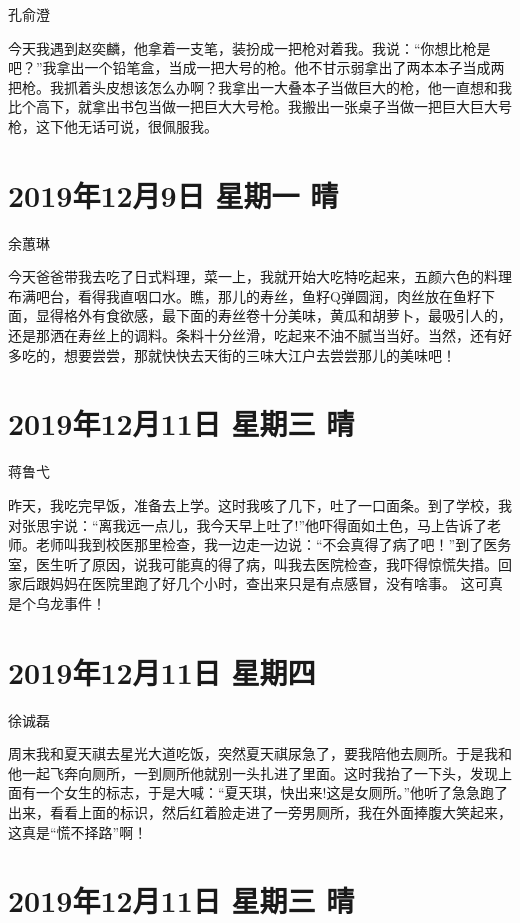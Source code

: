孔俞澄

今天我遇到赵奕麟，他拿着一支笔，装扮成一把枪对着我。我说：``你想比枪是吧？''我拿出一个铅笔盒，当成一把大号的枪。他不甘示弱拿出了两本本子当成两把枪。我抓着头皮想该怎么办啊？我拿出一大叠本子当做巨大的枪，他一直想和我比个高下，就拿出书包当做一把巨大大号枪。我搬出一张桌子当做一把巨大巨大号枪，这下他无话可说，很佩服我。

\section{2019年12月9日 星期一 晴}

余蕙琳

今天爸爸带我去吃了日式料理，菜一上，我就开始大吃特吃起来，五颜六色的料理布满吧台，看得我直咽口水。瞧，那儿的寿丝，鱼籽Q弹圆润，肉丝放在鱼籽下面，显得格外有食欲感，最下面的寿丝卷十分美味，黄瓜和胡萝卜，最吸引人的，还是那洒在寿丝上的调料。条料十分丝滑，吃起来不油不腻当当好。当然，还有好多吃的，想要尝尝，那就快快去天街的三味大江户去尝尝那儿的美味吧！

\section{2019年12月11日 星期三 晴}

蒋鲁弋

昨天，我吃完早饭，准备去上学。这时我咳了几下，吐了一口面条。到了学校，我对张思宇说：``离我远一点儿，我今天早上吐了!''他吓得面如土色，马上告诉了老师。老师叫我到校医那里检查，我一边走一边说：``不会真得了病了吧！''到了医务室，医生听了原因，说我可能真的得了病，叫我去医院检查，我吓得惊慌失措。回家后跟妈妈在医院里跑了好几个小时，查出来只是有点感冒，没有啥事。
这可真是个乌龙事件！

\section{2019年12月11日 星期四}

徐诚磊

周末我和夏天祺去星光大道吃饭，突然夏天祺尿急了，要我陪他去厕所。于是我和他一起飞奔向厕所，一到厕所他就别一头扎进了里面。这时我抬了一下头，发现上面有一个女生的标志，于是大喊：``夏天琪，快出来!这是女厕所。''他听了急急跑了出来，看看上面的标识，然后红着脸走进了一旁男厕所，我在外面捧腹大笑起来，这真是``慌不择路''啊！

\section{2019年12月11日 星期三 晴}

